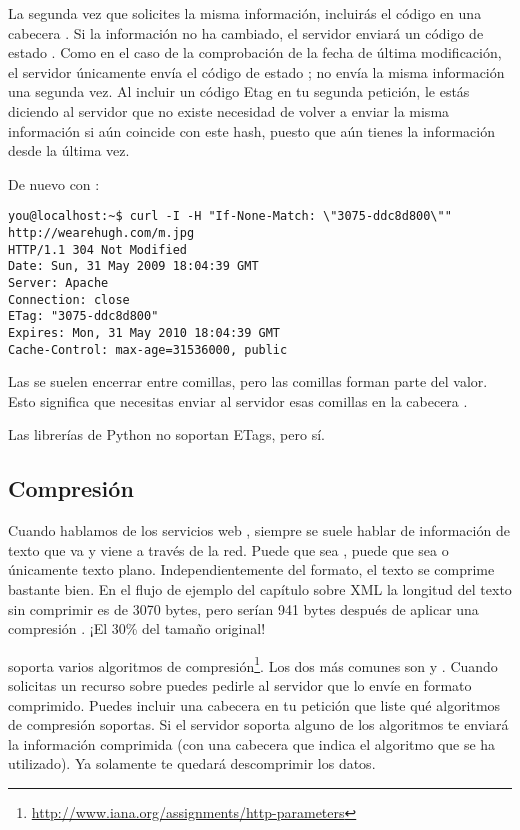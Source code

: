 La segunda vez que solicites la misma información, incluirás el código  en una cabecera . Si la información no ha cambiado, el servidor enviará un código de estado . Como en el caso de la comprobación de la fecha de última modificación, el servidor únicamente envía el código de estado ; no envía la misma información una segunda vez. Al incluir un código Etag en tu segunda petición, le estás diciendo al servidor que no existe necesidad de volver a enviar la misma información si aún coincide con este hash, puesto que aún tienes la información desde la última vez.

\pagebreak[3]
De nuevo con :
\nopagebreak[4]

\noindent\begin{minipage}{\textwidth}
\begin{lstlisting}[mathescape=False]
you@localhost:~$ curl -I -H "If-None-Match: \"3075-ddc8d800\"" 
http://wearehugh.com/m.jpg
HTTP/1.1 304 Not Modified
Date: Sun, 31 May 2009 18:04:39 GMT
Server: Apache
Connection: close
ETag: "3075-ddc8d800"
Expires: Mon, 31 May 2010 18:04:39 GMT
Cache-Control: max-age=31536000, public
\end{lstlisting}
\end{minipage}


Las  se suelen encerrar entre comillas, pero las comillas forman parte del valor. Esto significa que necesitas enviar al servidor esas comillas en la cabecera .

Las librerías de Python  no soportan ETags, pero  sí.

\subsection{Compresión}

Cuando hablamos de los servicios web , siempre se suele hablar de información de texto que va y viene a través de la red. Puede que sea , puede que sea  o únicamente texto plano. Independientemente del formato, el texto se comprime bastante bien. En el flujo de ejemplo del capítulo sobre XML la longitud del texto sin comprimir es de 3070 bytes, pero serían 941 bytes después de aplicar una compresión . ¡El 30\% del tamaño original!

 soporta varios algoritmos de compresión\footnote{\href{http://www.iana.org/assignments/http-parameters}{http://www.iana.org/assignments/http-parameters}}. Los dos más comunes son  y . Cuando solicitas un recurso sobre  puedes pedirle al servidor que lo envíe en formato comprimido. Puedes incluir una cabecera  en tu petición que liste qué algoritmos de compresión soportas. Si el servidor soporta alguno de los algoritmos te enviará la información comprimida (con una cabecera  que indica el algoritmo que se ha utilizado). Ya solamente te quedará descomprimir los datos.

